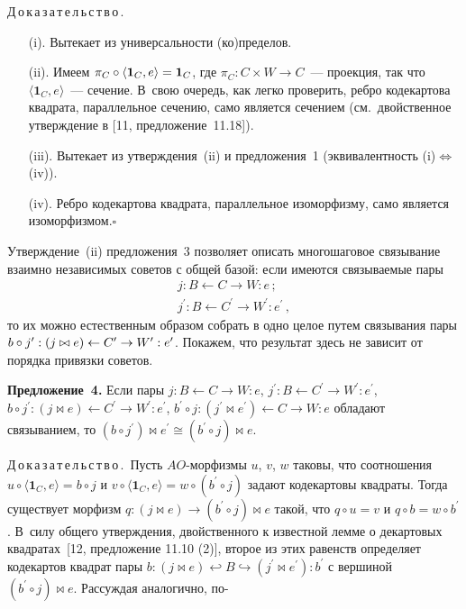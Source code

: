 \begin{multicols}{2}
   \medskip
   
  \noindent
  Д\,о\,к\,а\,з\,а\,т\,е\,л\,ь\,с\,т\,в\,о\,.
   \begin{itemize}
   \item[(i).] Вытекает из универсальности (ко)пределов.
   \item[(ii).] Имеем $\pi_C \circ \langle\mathbf{1}_C,e\rangle \hm=\mathbf{1}_C$, 
где $\pi_C : C\times  W \rightarrow C$~--- проекция, так что $\langle 
\mathbf{1}_C,e\rangle$~--- сечение. В~свою очередь, как легко проверить, ребро 
кодекартова квадрата, параллельное сечению, само является сечением (см.\ 
двойственное утверждение в [11, предложение~11.18]).
   \item[(iii).] Вытекает из утверждения~(ii) и предложения~1 (эквивалентность 
(i)\;$\Leftrightarrow$\;(iv)).
   \item[(iv).] Ребро кодекартова квадрата, параллельное изоморфизму, само 
является изоморфизмом.\hfill$\square$
   \end{itemize}
   
   Утверждение~(ii) предложения~3 позволяет описать многошаговое 
связывание взаимно независимых советов с общей базой: если имеются 
связываемые пары 
\begin{gather*}
j : B \leftarrow C \rightarrow W : e\,;\\
 j^\prime : B \leftarrow  C^\prime \rightarrow W^\prime : e^\prime\,,
 \end{gather*}
 то их можно естественным образом 
собрать в одно целое путем связывания пары $b \circ j^\prime : (j \bowtie e) 
\leftarrow C^\prime \hm\rightarrow W^\prime : e^\prime$. Покажем, что результат 
здесь не зависит от порядка привязки советов.
   
   \medskip
   
   \noindent
   \textbf{Предложение~4.} Если пары $j : B \leftarrow C \rightarrow W : e$, 
$j^\prime : B \leftarrow C^\prime \rightarrow W^\prime : e^\prime$, $b\circ  j^\prime 
: (j \bowtie e) \leftarrow C^\prime \rightarrow W^\prime : e^\prime$, $b^\prime 
\circ j : (j^\prime \bowtie e^\prime) \leftarrow C \rightarrow W : e$ обладают 
связыванием, то $(b \circ j^\prime) \bowtie e^\prime \cong  (b^\prime \circ  j) 
\bowtie e$.
  
  \medskip
  
  \noindent
  Д\,о\,к\,а\,з\,а\,т\,е\,л\,ь\,с\,т\,в\,о\,.\ Пусть $AO$-мор\-физ\-мы $u$, $v$, $w$ 
таковы, что соотношения $u\circ\langle \mathbf{1}_C,e\rangle = b \circ j$ и 
$v\circ \langle \mathbf{1}_C,e\rangle = w \circ (b^\prime \circ j)$ задают 
кодекартовы квадраты. Тогда существует морфизм $q : (j \bowtie e) \rightarrow 
(b^\prime \circ  j) \bowtie e$ такой, что $q \circ u = v$ и $q\circ  b = w 
\circ b^\prime$. В~силу общего утверждения, двойственного к известной лемме о 
декартовых квадратах~[12, предложение 11.10 (2)], второе из этих равенств 
определяет кодекартов квад\-рат пары $b : (j \bowtie e) \hookleftarrow B 
\hookrightarrow (j^\prime \bowtie e^\prime) : b^\prime$ с вершиной $(b^\prime 
\circ j) \bowtie  e$. Рассуждая аналогично, по-\linebreak\vspace*{-12pt}




\end{multicols}
